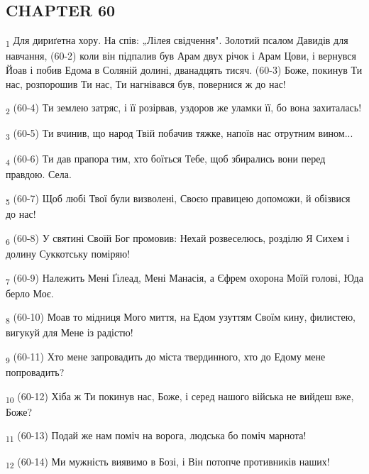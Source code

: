 \subsection{CHAPTER 60}
\begin{tcolorbox}
\textsubscript{1} Для дириґетна хору. На спів: „Лілея свідчення". Золотий псалом Давидів для навчання, (60-2) коли він підпалив був Арам двух річок і Арам Цови, і вернувся Йоав і побив Едома в Соляній долині, дванадцять тисяч. (60-3) Боже, покинув Ти нас, розпорошив Ти нас, Ти нагнівався був, повернися ж до нас!
\end{tcolorbox}
\begin{tcolorbox}
\textsubscript{2} (60-4) Ти землею затряс, і її розірвав, уздоров же уламки її, бо вона захиталась!
\end{tcolorbox}
\begin{tcolorbox}
\textsubscript{3} (60-5) Ти вчинив, що народ Твій побачив тяжке, напоїв нас отрутним вином...
\end{tcolorbox}
\begin{tcolorbox}
\textsubscript{4} (60-6) Ти дав прапора тим, хто боїться Тебе, щоб збирались вони перед правдою. Села.
\end{tcolorbox}
\begin{tcolorbox}
\textsubscript{5} (60-7) Щоб любі Твої були визволені, Своєю правицею допоможи, й обізвися до нас!
\end{tcolorbox}
\begin{tcolorbox}
\textsubscript{6} (60-8) У святині Своїй Бог промовив: Нехай розвеселюсь, розділю Я Сихем і долину Суккотську поміряю!
\end{tcolorbox}
\begin{tcolorbox}
\textsubscript{7} (60-9) Належить Мені Ґілеад, Мені Манасія, а Єфрем охорона Моїй голові, Юда берло Моє.
\end{tcolorbox}
\begin{tcolorbox}
\textsubscript{8} (60-10) Моав то мідниця Мого миття, на Едом узуттям Своїм кину, филистею, вигукуй для Мене із радістю!
\end{tcolorbox}
\begin{tcolorbox}
\textsubscript{9} (60-11) Хто мене запровадить до міста твердинного, хто до Едому мене попровадить?
\end{tcolorbox}
\begin{tcolorbox}
\textsubscript{10} (60-12) Хіба ж Ти покинув нас, Боже, і серед нашого війська не вийдеш вже, Боже?
\end{tcolorbox}
\begin{tcolorbox}
\textsubscript{11} (60-13) Подай же нам поміч на ворога, людська бо поміч марнота!
\end{tcolorbox}
\begin{tcolorbox}
\textsubscript{12} (60-14) Ми мужність виявимо в Бозі, і Він потопче противників наших!
\end{tcolorbox}
